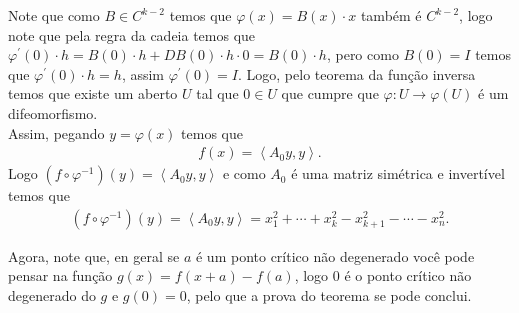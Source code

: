 \begin{homeworkProblem}[Seção 3-9]
\begin{solution}
    Note que como $B\in C^{k-2}$ temos que $\varphi(x)=B(x)\cdot x$ também é $C^{k-2}$, logo note que pela regra da cadeia temos que $\varphi^{\prime}(0)\cdot h=B(0)\cdot h+DB(0)\cdot h \cdot 0=B(0)\cdot h$, pero como $B(0)=I$ temos que $\varphi^{\prime}(0)\cdot h=h$, assim $\varphi^{\prime}(0)=I$. Logo, pelo teorema da função inversa temos que existe um aberto $U$ tal que $0\in U$ que cumpre que $\varphi:U\to\varphi(U)$ é um difeomorfismo.\\
    Assim, pegando $y=\varphi(x)$ temos que
    \begin{align*}
      f(x)=\left\langle A_0y,y \right\rangle.
    \end{align*}
    Logo $(f\circ \varphi^{-1})(y)=\left\langle A_0y,y \right\rangle$ e como $A_0$ é uma matriz simétrica e invertível temos que
    \begin{align*}
      (f\circ \varphi^{-1})(y)=\left\langle A_0y,y \right\rangle=x_1^{2}+\cdots+x_{k}^{2}-x_{k+1}^{2}-\cdots-x_{n}^{2}.
    \end{align*}
    
    Agora, note que, en geral se $a$ é um ponto crítico não degenerado você pode pensar na função $g(x)=f(x+a)-f(a)$, logo $0$ é o ponto crítico não degenerado do $g$ e $g(0)=0$, pelo que a prova do teorema se pode conclui. 
  \end{solution}
\end{homeworkProblem}
